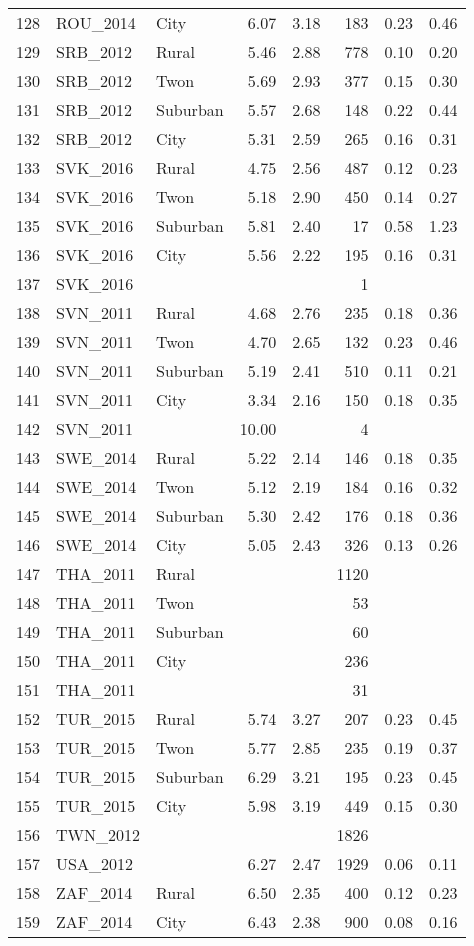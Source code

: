 \begin{table}[ht]
\begin{tabular}{rllrrrrr}
  128 & ROU\_2014 & City & 6.07 & 3.18 & 183 & 0.23 & 0.46 \\ 
  129 & SRB\_2012 & Rural & 5.46 & 2.88 & 778 & 0.10 & 0.20 \\ 
  130 & SRB\_2012 & Twon & 5.69 & 2.93 & 377 & 0.15 & 0.30 \\ 
  131 & SRB\_2012 & Suburban & 5.57 & 2.68 & 148 & 0.22 & 0.44 \\ 
  132 & SRB\_2012 & City & 5.31 & 2.59 & 265 & 0.16 & 0.31 \\ 
  133 & SVK\_2016 & Rural & 4.75 & 2.56 & 487 & 0.12 & 0.23 \\ 
  134 & SVK\_2016 & Twon & 5.18 & 2.90 & 450 & 0.14 & 0.27 \\ 
  135 & SVK\_2016 & Suburban & 5.81 & 2.40 &  17 & 0.58 & 1.23 \\ 
  136 & SVK\_2016 & City & 5.56 & 2.22 & 195 & 0.16 & 0.31 \\ 
  137 & SVK\_2016 &  &  &  &   1 &  &  \\ 
  138 & SVN\_2011 & Rural & 4.68 & 2.76 & 235 & 0.18 & 0.36 \\ 
  139 & SVN\_2011 & Twon & 4.70 & 2.65 & 132 & 0.23 & 0.46 \\ 
  140 & SVN\_2011 & Suburban & 5.19 & 2.41 & 510 & 0.11 & 0.21 \\ 
  141 & SVN\_2011 & City & 3.34 & 2.16 & 150 & 0.18 & 0.35 \\ 
  142 & SVN\_2011 &  & 10.00 &  &   4 &  &  \\ 
  143 & SWE\_2014 & Rural & 5.22 & 2.14 & 146 & 0.18 & 0.35 \\ 
  144 & SWE\_2014 & Twon & 5.12 & 2.19 & 184 & 0.16 & 0.32 \\ 
  145 & SWE\_2014 & Suburban & 5.30 & 2.42 & 176 & 0.18 & 0.36 \\ 
  146 & SWE\_2014 & City & 5.05 & 2.43 & 326 & 0.13 & 0.26 \\ 
  147 & THA\_2011 & Rural &  &  & 1120 &  &  \\ 
  148 & THA\_2011 & Twon &  &  &  53 &  &  \\ 
  149 & THA\_2011 & Suburban &  &  &  60 &  &  \\ 
  150 & THA\_2011 & City &  &  & 236 &  &  \\ 
  151 & THA\_2011 &  &  &  &  31 &  &  \\ 
  152 & TUR\_2015 & Rural & 5.74 & 3.27 & 207 & 0.23 & 0.45 \\ 
  153 & TUR\_2015 & Twon & 5.77 & 2.85 & 235 & 0.19 & 0.37 \\ 
  154 & TUR\_2015 & Suburban & 6.29 & 3.21 & 195 & 0.23 & 0.45 \\ 
  155 & TUR\_2015 & City & 5.98 & 3.19 & 449 & 0.15 & 0.30 \\ 
  156 & TWN\_2012 &  &  &  & 1826 &  &  \\ 
  157 & USA\_2012 &  & 6.27 & 2.47 & 1929 & 0.06 & 0.11 \\ 
  158 & ZAF\_2014 & Rural & 6.50 & 2.35 & 400 & 0.12 & 0.23 \\ 
  159 & ZAF\_2014 & City & 6.43 & 2.38 & 900 & 0.08 & 0.16 \\ 
   \hline
\end{tabular}
\end{table}
